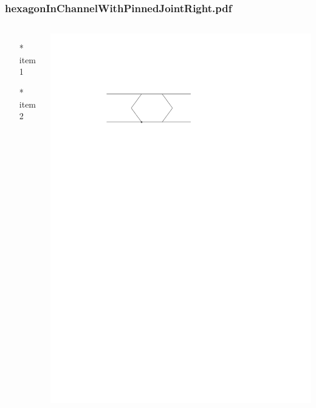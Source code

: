 \begin{frame} \frametitle{hexagonInChannelWithPinnedJointRight.pdf}
    \begin{columns}[c]
        \begin{itemize}
            \item[*] item 1
            \item[*] item 2
        \end{itemize}
        \begin{minipage}{\linewidth}
            \begin{center}
            \includegraphics[width=.9\textwidth]{graphics/hexagonInChannelWithPinnedJointRight.pdf}
            \label{gfx:hexagonInChannelWithPinnedJointRight.pdf}
            \end{center}
        \end{minipage}
    \end{columns}
\end{frame}
